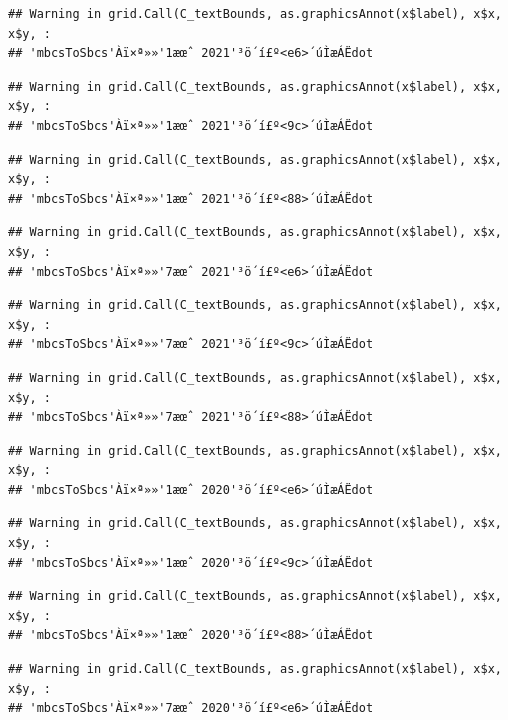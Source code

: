\documentclass[
]{book}
\begin{document}
\begin{verbatim}
## Warning in grid.Call(C_textBounds, as.graphicsAnnot(x$label), x$x, x$y, :
## 'mbcsToSbcs'Àï×ª»»'1æœˆ 2021'³ö´í£º<e6>´úÌæÁËdot
\end{verbatim}

\begin{verbatim}
## Warning in grid.Call(C_textBounds, as.graphicsAnnot(x$label), x$x, x$y, :
## 'mbcsToSbcs'Àï×ª»»'1æœˆ 2021'³ö´í£º<9c>´úÌæÁËdot
\end{verbatim}

\begin{verbatim}
## Warning in grid.Call(C_textBounds, as.graphicsAnnot(x$label), x$x, x$y, :
## 'mbcsToSbcs'Àï×ª»»'1æœˆ 2021'³ö´í£º<88>´úÌæÁËdot
\end{verbatim}

\begin{verbatim}
## Warning in grid.Call(C_textBounds, as.graphicsAnnot(x$label), x$x, x$y, :
## 'mbcsToSbcs'Àï×ª»»'7æœˆ 2021'³ö´í£º<e6>´úÌæÁËdot
\end{verbatim}

\begin{verbatim}
## Warning in grid.Call(C_textBounds, as.graphicsAnnot(x$label), x$x, x$y, :
## 'mbcsToSbcs'Àï×ª»»'7æœˆ 2021'³ö´í£º<9c>´úÌæÁËdot
\end{verbatim}

\begin{verbatim}
## Warning in grid.Call(C_textBounds, as.graphicsAnnot(x$label), x$x, x$y, :
## 'mbcsToSbcs'Àï×ª»»'7æœˆ 2021'³ö´í£º<88>´úÌæÁËdot
\end{verbatim}

\begin{verbatim}
## Warning in grid.Call(C_textBounds, as.graphicsAnnot(x$label), x$x, x$y, :
## 'mbcsToSbcs'Àï×ª»»'1æœˆ 2020'³ö´í£º<e6>´úÌæÁËdot
\end{verbatim}

\begin{verbatim}
## Warning in grid.Call(C_textBounds, as.graphicsAnnot(x$label), x$x, x$y, :
## 'mbcsToSbcs'Àï×ª»»'1æœˆ 2020'³ö´í£º<9c>´úÌæÁËdot
\end{verbatim}

\begin{verbatim}
## Warning in grid.Call(C_textBounds, as.graphicsAnnot(x$label), x$x, x$y, :
## 'mbcsToSbcs'Àï×ª»»'1æœˆ 2020'³ö´í£º<88>´úÌæÁËdot
\end{verbatim}

\begin{verbatim}
## Warning in grid.Call(C_textBounds, as.graphicsAnnot(x$label), x$x, x$y, :
## 'mbcsToSbcs'Àï×ª»»'7æœˆ 2020'³ö´í£º<e6>´úÌæÁËdot
\end{verbatim}
\end{document}
